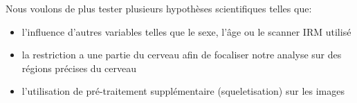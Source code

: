 Nous voulons de plus tester plusieurs hypothèses scientifiques telles que:
\begin{itemize}
	\item l'influence d'autres variables telles que le sexe, l'âge ou le scanner IRM utilisé
	\item la restriction a une partie du cerveau afin de focaliser notre analyse sur des régions précises du cerveau
	\item l'utilisation de pré-traitement supplémentaire (squeletisation) sur les images
\end{itemize}

% 
